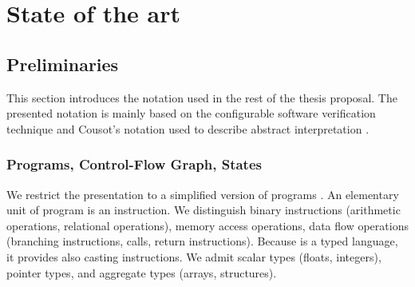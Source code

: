 \chapter{State of the art}
\label{ch:state}



%
%


\section{Preliminaries}
\label{sec:preliminaries}

This section introduces the notation used in the rest of the thesis proposal.
The presented notation is mainly based on the configurable software
verification technique \cite{Beyer2007, Beyer2018, Beyer2018b} and Cousot's
notation used to describe abstract interpretation \cite{Cousot2012}.

\subsection{Programs, Control-Flow Graph, States}

We restrict the presentation to a simplified version of \llvm programs
\cite{Lattner04}. An elementary unit of \llvm program is an instruction. We
distinguish binary instructions (arithmetic operations, relational operations),
memory access operations, data flow operations (branching instructions, calls,
return instructions). Because \llvmir is a typed language, it provides also
casting instructions. We admit scalar types (floats, integers), pointer types,
and aggregate types (arrays, structures).

